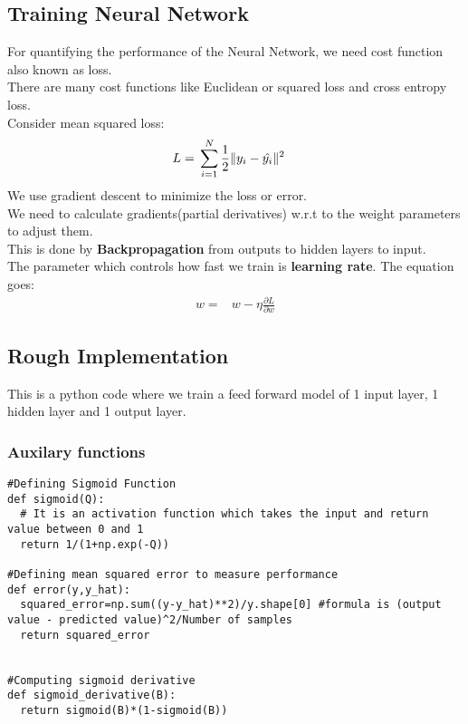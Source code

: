 \documentclass[12pt,letterpaper, onecolumn]{exam}
\begin{document}
\subsection*{Training Neural Network}
For quantifying the performance of the Neural Network, we need cost function also known as loss.
\\ There are many cost functions like Euclidean or squared loss and cross entropy loss.\\
Consider mean squared loss: 
\begin{align}
L ={}& \sum_{i=1}^N \frac{1}{2} \lVert y_i - \hat{y_i}\rVert^2
\end{align}
We use gradient descent to minimize the loss or error.\\
We need to calculate gradients(partial derivatives) w.r.t to the weight parameters to adjust them.\\
This is done by {\large \textbf{Backpropagation}} from outputs to hidden layers to input.\\
The parameter which controls how fast we train is \textbf{learning rate}. The equation goes:
\begin{align}
w ={}& w - \eta \frac{ \partial L}{\partial w}
\end{align}

\subsection*{Rough Implementation}
This is a python code where we train a feed forward model of 1 input layer, 1 hidden layer and 1 output layer.\\

\subsubsection*{Auxilary functions}
\begin{lstlisting}
#Defining Sigmoid Function
def sigmoid(Q):
  # It is an activation function which takes the input and return value between 0 and 1
  return 1/(1+np.exp(-Q))

#Defining mean squared error to measure performance 
def error(y,y_hat):
  squared_error=np.sum((y-y_hat)**2)/y.shape[0] #formula is (output value - predicted value)^2/Number of samples
  return squared_error
  
  
#Computing sigmoid derivative
def sigmoid_derivative(B):
  return sigmoid(B)*(1-sigmoid(B))
  \end{lstlisting}
  
\end{document}
